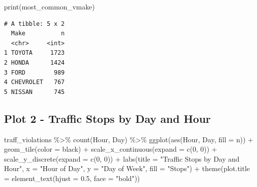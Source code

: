 \documentclass[
  letterpaper,
  DIV=11,
  numbers=noendperiod]{scrartcl}
\newenvironment{Shaded}{\begin{snugshade}}{\end{snugshade}}
\newcommand{\AttributeTok}[1]{\textcolor[rgb]{0.40,0.45,0.13}{#1}}
\newcommand{\DecValTok}[1]{\textcolor[rgb]{0.68,0.00,0.00}{#1}}
\newcommand{\FloatTok}[1]{\textcolor[rgb]{0.68,0.00,0.00}{#1}}
\newcommand{\FunctionTok}[1]{\textcolor[rgb]{0.28,0.35,0.67}{#1}}
\newcommand{\NormalTok}[1]{\textcolor[rgb]{0.00,0.23,0.31}{#1}}
\newcommand{\SpecialCharTok}[1]{\textcolor[rgb]{0.37,0.37,0.37}{#1}}
\newcommand{\StringTok}[1]{\textcolor[rgb]{0.13,0.47,0.30}{#1}}
\begin{document}
\begin{Shaded}
\begin{Highlighting}[]
\FunctionTok{print}\NormalTok{(most\_common\_vmake)}
\end{Highlighting}
\end{Shaded}

\begin{verbatim}
# A tibble: 5 x 2
  Make          n
  <chr>     <int>
1 TOYOTA     1723
2 HONDA      1424
3 FORD        989
4 CHEVROLET   767
5 NISSAN      745
\end{verbatim}

\subsection{Plot 2 - Traffic Stops by Day and
Hour}\label{plot-2---traffic-stops-by-day-and-hour}

\begin{Shaded}
\begin{Highlighting}[]
\NormalTok{traff\_violations }\SpecialCharTok{\%\textgreater{}\%} 
  \FunctionTok{count}\NormalTok{(Hour, Day) }\SpecialCharTok{\%\textgreater{}\%}
  \FunctionTok{ggplot}\NormalTok{(}\FunctionTok{aes}\NormalTok{(Hour, Day, }\AttributeTok{fill =}\NormalTok{ n)) }\SpecialCharTok{+} \FunctionTok{geom\_tile}\NormalTok{(}\AttributeTok{color =} \StringTok{\textquotesingle{}black\textquotesingle{}}\NormalTok{) }\SpecialCharTok{+} \FunctionTok{scale\_x\_continuous}\NormalTok{(}\AttributeTok{expand =} \FunctionTok{c}\NormalTok{(}\DecValTok{0}\NormalTok{, }\DecValTok{0}\NormalTok{)) }\SpecialCharTok{+} \FunctionTok{scale\_y\_discrete}\NormalTok{(}\AttributeTok{expand =} \FunctionTok{c}\NormalTok{(}\DecValTok{0}\NormalTok{, }\DecValTok{0}\NormalTok{)) }\SpecialCharTok{+} \FunctionTok{labs}\NormalTok{(}\AttributeTok{title =} \StringTok{"Traffic Stops by Day and Hour"}\NormalTok{, }\AttributeTok{x =} \StringTok{"Hour of Day"}\NormalTok{, }\AttributeTok{y =} \StringTok{"Day of Week"}\NormalTok{, }\AttributeTok{fill =} \StringTok{"Stops"}\NormalTok{) }\SpecialCharTok{+}
  \FunctionTok{theme}\NormalTok{(}\AttributeTok{plot.title =} \FunctionTok{element\_text}\NormalTok{(}\AttributeTok{hjust =} \FloatTok{0.5}\NormalTok{, }\AttributeTok{face =} \StringTok{"bold"}\NormalTok{))}
\end{Highlighting}
\end{Shaded}
\end{document}
